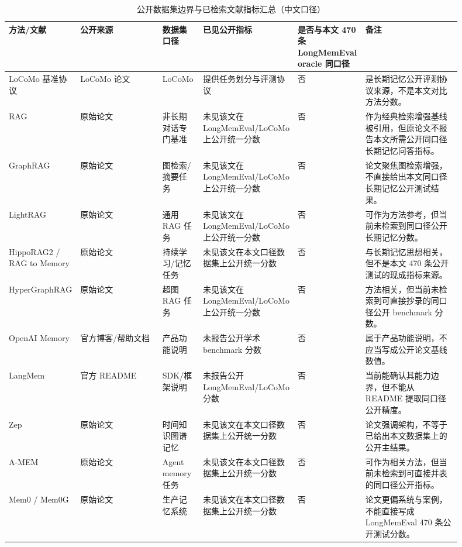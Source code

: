 \documentclass[a4paper,fleqn]{cas-sc}
\begin{document}
\begin{CJK*}{UTF8}{gbsn}
\begin{table}[t]
\centering
\scriptsize
\caption{公开数据集边界与已检索文献指标汇总（中文口径）}
\label{tab:public-benchmark-metrics-cn}
\setlength{\tabcolsep}{3pt}
\begin{tabular}{P{0.11\linewidth}P{0.20\linewidth}P{0.09\linewidth}P{0.12\linewidth}P{0.15\linewidth}P{0.23\linewidth}}
\toprule
方法/文献 & 公开来源 & 数据集口径 & 已见公开指标 & 是否与本文 470 条 LongMemEval oracle 同口径 & 备注 \\
\midrule
LoCoMo 基准协议 \citep{maharana2024locomo} & LoCoMo 论文 & LoCoMo & 提供任务划分与评测协议 & 否 & 是长期记忆公开评测协议来源，不是本文对比方法分数。 \\
RAG \citep{lewis2020rag} & 原始论文 & 非长期对话专门基准 & 未见该文在 LongMemEval/LoCoMo 上公开统一分数 & 否 & 作为经典检索增强基线被引用，但原论文不报告本文所需公开同口径长期记忆问答指标。 \\
GraphRAG \citep{edge2024graphrag} & 原始论文 & 图检索/摘要任务 & 未见该文在 LongMemEval/LoCoMo 上公开统一分数 & 否 & 论文聚焦图检索增强，不直接给出本文同口径长期记忆公开测试结果。 \\
LightRAG \citep{guo2024lightrag} & 原始论文 & 通用 RAG 任务 & 未见该文在 LongMemEval/LoCoMo 上公开统一分数 & 否 & 可作为方法参考，但当前未检索到同口径公开长期记忆分数。 \\
HippoRAG2 / RAG to Memory & 原始论文 & 持续学习/记忆任务 & 未见该文在本文口径数据集上公开统一分数 & 否 & 与长期记忆思想相关，但不是本文 470 条公开测试的现成指标来源。 \\
HyperGraphRAG & 原始论文 & 超图 RAG 任务 & 未见该文在 LongMemEval/LoCoMo 上公开统一分数 & 否 & 方法相关，但当前未检索到可直接抄录的同口径公开 benchmark 分数。 \\
OpenAI Memory & 官方博客/帮助文档 & 产品功能说明 & 未报告公开学术 benchmark 分数 & 否 & 属于产品功能说明，不应当写成公开论文基线数值。 \\
LangMem & 官方 README & SDK/框架说明 & 未报告公开 LongMemEval/LoCoMo 分数 & 否 & 当前能确认其能力边界，但不能从 README 提取同口径公开精度。 \\
Zep \citep{rasmussen2025zep} & 原始论文 & 时间知识图谱记忆 & 未见该文在本文口径数据集上公开统一分数 & 否 & 论文强调架构，不等于已给出本文数据集上的公开主结果。 \\
A-MEM \citep{xu2025amem} & 原始论文 & Agent memory 任务 & 未见该文在本文口径数据集上公开统一分数 & 否 & 可作为相关方法，但当前未检索到可直接并表的同口径公开指标。 \\
Mem0 / Mem0G \citep{chhikara2025mem0} & 原始论文 & 生产记忆系统 & 未见该文在本文口径数据集上公开统一分数 & 否 & 论文更偏系统与案例，不能直接写成 LongMemEval 470 条公开测试分数。 \\

\end{tabular}
\end{table}
\end{CJK*}
\end{document}
